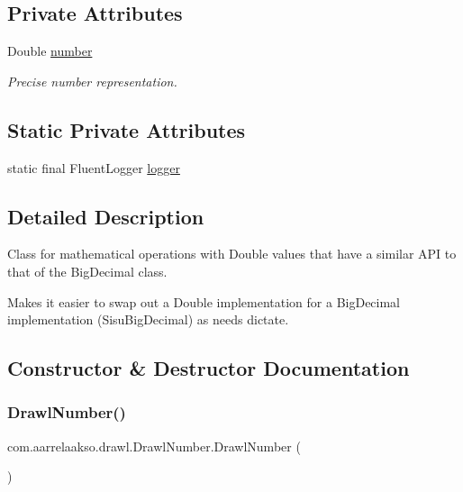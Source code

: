 \subsection*{Private Attributes}
\begin{DoxyCompactItemize}
\item 
Double \hyperlink{classcom_1_1aarrelaakso_1_1drawl_1_1_drawl_number_a9fe9f40163a4f5581b35d61ecf63f278}{number}
\begin{DoxyCompactList}\small\item\em Precise number representation. \end{DoxyCompactList}\end{DoxyCompactItemize}
\subsection*{Static Private Attributes}
\begin{DoxyCompactItemize}
\item 
static final Fluent\+Logger \hyperlink{classcom_1_1aarrelaakso_1_1drawl_1_1_drawl_number_ad2eb8e8b4021e0d474b39f06e81ff9e7}{logger}
\end{DoxyCompactItemize}


\subsection{Detailed Description}
Class for mathematical operations with Double values that have a similar A\+PI to that of the Big\+Decimal class. 

Makes it easier to swap out a Double implementation for a Big\+Decimal implementation (Sisu\+Big\+Decimal) as needs dictate. 

\subsection{Constructor \& Destructor Documentation}
\mbox{\label{classcom_1_1aarrelaakso_1_1drawl_1_1_drawl_number_ae870bc04b03801d06c155d5f89e1319e}} 
\subsubsection{\texorpdfstring{Drawl\+Number()}{DrawlNumber()}\hspace{0.1cm}{\footnotesize\ttfamily [1/4]}}
{\footnotesize\ttfamily com.\+aarrelaakso.\+drawl.\+Drawl\+Number.\+Drawl\+Number (\begin{DoxyParamCaption}{ }\end{DoxyParamCaption})\hspace{0.3cm}{\ttfamily [private]}}



